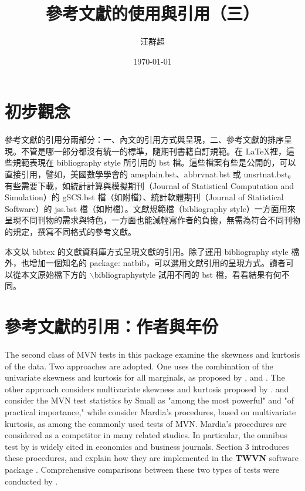 \documentclass[12pt, a4paper]{article}
\title{ {\MB 參考文獻的使用與引用（三）}}		%
\author{{\SM 汪群超}}						%
\date{{\TT \today }}
\begin{document}
\maketitle
\fontsize{12}{22pt}\selectfont 
\section{初步觀念}
參考文獻的引用分兩部分：一、內文的引用方式與呈現，二、參考文獻的排序呈現。不管是哪一部分都沒有統一的標準，隨期刊書籍自訂規範。在   \LaTeX 裡，這些規範表現在 bibliography style 所引用的 bst 檔。這些檔案有些是公開的，可以直接引用，譬如，美國數學學會的 amsplain.bst、abbrvnat.bst 或 unsrtnat.bst。有些需要下載，如統計計算與模擬期刊（Journal of Statistical Computation and Simulation）的 gSCS.bst 檔（如附檔）、統計軟體期刊（Journal of Statistical Software）的 jss.bst 檔（如附檔）。文獻規範檔（bibliography style）一方面用來呈現不同刊物的需求與特色，一方面也能減輕寫作者的負擔，無需為符合不同刊物的規定，撰寫不同格式的參考文獻。

本文以 bibtex 的文獻資料庫方式呈現文獻的引用。除了運用 bibliography style 檔外，也增加一個知名的 package: natbib，可以選用文獻引用的呈現方式。讀者可以從本文原始檔下方的 $\backslash$bibliographystyle  試用不同的 bst 檔，看看結果有何不同。

\section{參考文獻的引用：作者與年份}
The second class of MVN tests in this package examine the skewness and kurtosis of the data. Two approaches are adopted. One uses the combination of the univariate skewness and kurtosis for all marginals, as proposed by \cite{SMALL:1980}, and \cite{DOORNIK:2008}. The other approach considers multivariate skewness and kurtosis proposed by \cite{MARDIA:1970}.   \cite{FOSTER:1981} and \cite{HORSWELL:1990} consider the MVN test statistics by Small as "among the most powerful" and "of practical importance,"  while \cite{MM} consider Mardia's procedures, based on multivariate kurtosis, as among the commonly used tests of MVN.  Mardia's procedures are considered as a competitor  in many related studies.
In particular, the omnibus test by \cite{DOORNIK:2008} is widely cited in economics and business journals. Section 3 introduces these procedures, and explain how they are implemented in the \textbf{TWVN} software package \cite{WH}. Comprehensive  comparisons between these two types of tests were conducted by \cite{HORSWELL:1992}.
\end{document}
